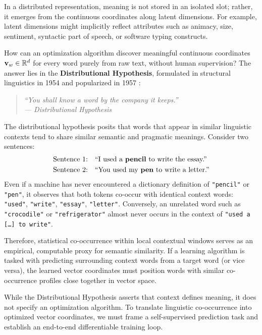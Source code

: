 \documentclass[../../main.tex]{subfiles}
\begin{document}
In a distributed representation, meaning is not stored in an isolated slot; rather, it emerges from the continuous coordinates along latent dimensions. For example, latent dimensions might implicitly reflect attributes such as animacy, size, sentiment, syntactic part of speech, or software typing constructs.



How can an optimization algorithm discover meaningful continuous coordinates $\mathbf{v}_w \in \mathbb{R}^d$ for every word purely from raw text, without human supervision? The answer lies in the \textbf{Distributional Hypothesis}, formulated in structural linguistics in 1954 \cite{harris1954} and popularized in 1957 \cite{firth1957}:
\begin{quote}
\centering
\itshape
``You shall know a word by the company it keeps.''\\
\upshape\hfill--- Distributional Hypothesis \cite{firth1957}
\end{quote}

The distributional hypothesis posits that words that appear in similar linguistic contexts tend to share similar semantic and pragmatic meanings. Consider two sentences:
\begin{align*}
\text{Sentence 1:} \quad &\text{``I used a \textbf{pencil} to write the essay.''} \\
\text{Sentence 2:} \quad &\text{``You used my \textbf{pen} to write a letter.''}
\end{align*}
Even if a machine has never encountered a dictionary definition of \texttt{"pencil"} or \texttt{"pen"}, it observes that both tokens co-occur with identical context words: \texttt{"used"}, \texttt{"write"}, \texttt{"essay"}, \texttt{"letter"}. Conversely, an unrelated word such as \texttt{"crocodile"} or \texttt{"refrigerator"} almost never occurs in the context of \texttt{"used a [\dots] to write"}.

Therefore, statistical co-occurrence within local contextual windows serves as an empirical, computable proxy for semantic similarity. If a learning algorithm is tasked with predicting surrounding context words from a target word (or vice versa), the learned vector coordinates must position words with similar co-occurrence profiles close together in vector space.

While the Distributional Hypothesis asserts that context defines meaning, it does not specify an optimization algorithm. To translate linguistic co-occurrence into optimized vector coordinates, we must frame a self-supervised prediction task and establish an end-to-end differentiable training loop.
\end{document}
